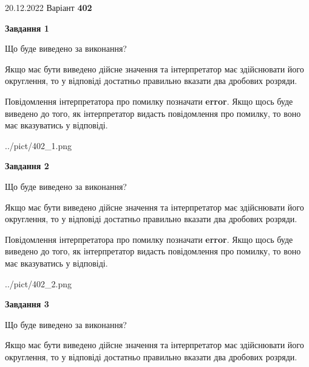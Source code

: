 \documentclass[12pt, ukrainian]{article}
\begin{document}
{20.12.2022 Варіант \No \textbf { 402 }\par}
{
\begin {Large}

{\begin {center}\textbf{Завдання 1}\end {center}}\par
Що буде виведено за виконання? \par

Якщо має бути виведено дійсне значення та інтерпретатор має здійснювати його округлення, 
то у відповіді достатньо правильно вказати два дробових розряди.

Повідомлення інтерпретатора про помилку позначати \textbf{error}.
Якщо щось буде виведено до того, як інтерпретатор видасть повідомлення про помилку, 
то воно має вказуватись у відповіді. \par

\begin{center}
	{../pict/402_1.png}
\end{center}
\newpage

{\begin {center}\textbf{Завдання 2}\end {center}}\par
Що буде виведено за виконання? \par

Якщо має бути виведено дійсне значення та інтерпретатор має здійснювати його округлення, 
то у відповіді достатньо правильно вказати два дробових розряди.

Повідомлення інтерпретатора про помилку позначати \textbf{error}.
Якщо щось буде виведено до того, як інтерпретатор видасть повідомлення про помилку, 
то воно має вказуватись у відповіді. \par

\begin{center}
	{../pict/402_2.png}
\end{center}
\newpage

{\begin {center}\textbf{Завдання 3}\end {center}}\par
Що буде виведено за виконання? \par

Якщо має бути виведено дійсне значення та інтерпретатор має здійснювати його округлення, 
то у відповіді достатньо правильно вказати два дробових розряди.


\end{Large}}
\end{document}
